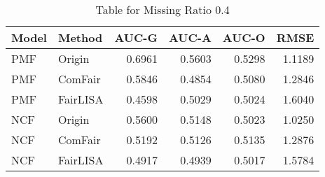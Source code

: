 \begin{table}
\centering
\caption{Table for Missing Ratio 0.4}
\label{tab:missing_0.4}
\begin{tabular}{llrrrr}
\toprule
Model &   Method &  AUC-G &  AUC-A &  AUC-O &   RMSE \\
\midrule
  PMF &   Origin & 0.6961 & 0.5603 & 0.5298 & 1.1189 \\
  PMF &  ComFair & 0.5846 & 0.4854 & 0.5080 & 1.2846 \\
  PMF & FairLISA & 0.4598 & 0.5029 & 0.5024 & 1.6040 \\
  NCF &   Origin & 0.5600 & 0.5148 & 0.5023 & 1.0250 \\
  NCF &  ComFair & 0.5192 & 0.5126 & 0.5135 & 1.2876 \\
  NCF & FairLISA & 0.4917 & 0.4939 & 0.5017 & 1.5784 \\
\bottomrule
\end{tabular}
\end{table}
